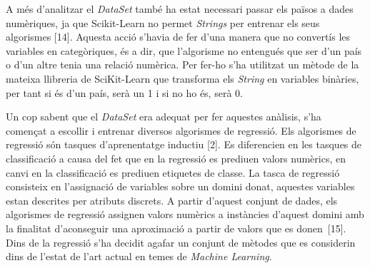 \documentclass[10pt,a4paper,twocolumn,twoside]{article}
\begin{document}
A més d'analitzar el \textit{DataSet} també ha estat necessari passar els països a dades numèriques, ja que Scikit-Learn no permet \textit{Strings} per entrenar els seus algorismes [14]. Aquesta acció s'havia de fer d'una manera que no convertís les variables en categòriques, és a dir, que l'algorisme no entengués que ser d'un país o d'un altre tenia una relació numèrica. Per fer-ho s'ha utilitzat un mètode de la mateixa llibreria de SciKit-Learn que transforma els \textit{String} en variables binàries, per tant si és d'un país, serà un 1 i si no ho és, serà 0.

Un cop sabent que el \textit{DataSet} era adequat per fer aquestes anàlisis, s'ha començat a escollir i entrenar diversos algorismes de regressió. Els algorismes de regressió són tasques d'aprenentatge inductiu [2]. Es diferencien en les tasques de classificació a causa del fet que en la regressió es prediuen valors numèrics, en canvi en la classificació es prediuen etiquetes de classe. La tasca de regressió consisteix en l'assignació de variables sobre un domini donat, aquestes variables estan descrites per atributs discrets. A partir d'aquest conjunt de dades, els algorismes de regressió assignen valors numèrics a instàncies d'aquest domini amb la finalitat d'aconseguir una aproximació a partir de valors que es donen~[15]. Dins de la regressió s'ha decidit agafar un conjunt de mètodes que es considerin dins de l'estat de l'art actual en temes de \textit{Machine Learning}.
\end{document}
